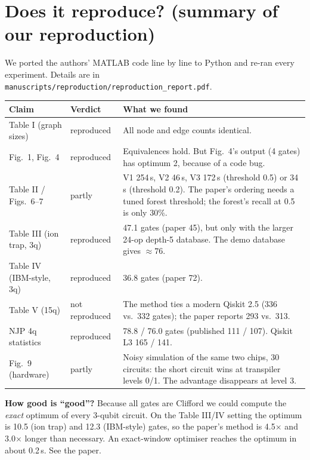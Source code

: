 \documentclass[11pt,a4paper]{article}
\begin{document}
\section{Does it reproduce? (summary of our reproduction)}
We ported the authors' MATLAB code line by line to Python and re-ran every experiment. Details are in
\texttt{manuscripts/reproduction/reproduction\_report.pdf}.
\begin{center}\small
\begin{tabular}{p{4.0cm}p{2.3cm}p{8.4cm}}\toprule
Claim&Verdict&What we found\\\midrule
Table I (graph sizes)&reproduced&All node and edge counts identical.\\
Fig.~1, Fig.~4&reproduced&Equivalences hold. But Fig.~4's output (4 gates) has optimum 2, because of a code bug.\\
Table II / Figs.~6--7&partly&V1 254\,s, V2 46\,s, V3 172\,s (threshold 0.5) or 34\,s (threshold 0.2). The paper's ordering needs a tuned
forest threshold; the forest's recall at 0.5 is only 30\%.\\
Table III (ion trap, 3q)&reproduced&47.1 gates (paper 45), but only with the larger 24-op depth-5 database. The demo database gives $\approx76$.\\
Table IV (IBM-style, 3q)&reproduced&36.8 gates (paper 72).\\
Table V (15q)&not reproduced&The method ties a modern Qiskit 2.5 (336 vs.\ 332 gates); the paper reports 293 vs.\ 313.\\
NJP 4q statistics&reproduced&78.8 / 76.0 gates (published 111 / 107). Qiskit L3 165 / 141.\\
Fig.~9 (hardware)&partly&Noisy simulation of the same two chips, 30 circuits: the short circuit wins at transpiler levels 0/1. The
advantage disappears at level 3.\\\bottomrule
\end{tabular}
\end{center}
\textbf{How good is ``good''?} Because all gates are Clifford we could compute the \emph{exact} optimum of every 3-qubit circuit.
On the Table III/IV setting the optimum is 10.5 (ion trap) and 12.3 (IBM-style) gates, so the paper's method is 4.5$\times$ and
3.0$\times$ longer than necessary. An exact-window optimiser reaches the optimum in about 0.2\,s. See the paper.

\end{document}
